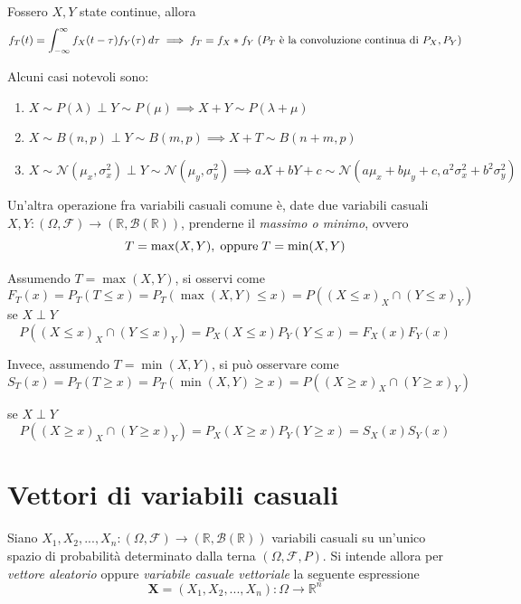 \documentclass{article}
\begin{document}
            Fossero $X, Y$ state continue, allora
            \[
                f_{T}(t) = \int_{-\infty}^{\infty} f_{X}(t - \tau)f_{Y}(\tau) \: d\tau \implies f_{T} = f_{X} * f_{Y} \; (P_{T} \textnormal{ è la convoluzione continua di } P_{X}, P_{Y})
            \]

            Alcuni casi notevoli sono:
            \begin{enumerate}
                \item $X \sim P(\lambda) \perp Y \sim P(\mu) \implies X + Y \sim P(\lambda + \mu)$
                \item $X \sim B(n, p) \perp Y \sim B(m, p) \implies X + T \sim B(n + m, p)$
                \item $X \sim \mathcal{N}(\mu_{x}, \sigma_{x}^{2}) \perp Y \sim \mathcal{N}(\mu_{y}, \sigma_{y}^{2}) \implies aX + bY + c \sim \mathcal{N}(a\mu_{x} + b\mu_{y} + c, a^{2} \sigma_{x}^{2} + b^{2} \sigma_{y}^{2})$
            \end{enumerate}

            
            \vspace{10pt}
            Un'altra operazione fra variabili casuali comune è, date due variabili casuali $X, Y: (\Omega, \mathcal{F}) \rightarrow (\mathbb{R}, \mathcal{B}(\mathbb{R}))$, prenderne il \textit{massimo o minimo}, ovvero
            \[
                T = \max(X, Y), \; \textnormal{oppure} \; T = \min(X, Y)
            \]
            
            Assumendo $T = \max(X, Y)$, si osservi come
            \[
                F_{T}(x) = P_{T}(T \leq x) = P_{T}(\max(X, Y) \leq x) = P((X \leq x)_{X} \cap (Y \leq x)_{Y})
            \]
            se $X \perp Y$
            \[
                P((X \leq x)_{X} \cap (Y \leq x)_{Y}) = P_{X}(X \leq x)P_{Y}(Y \leq x) = F_{X}(x)F_{Y}(x)
            \]

            Invece, assumendo $T = \min(X, Y)$, si può osservare come
            \[
                S_{T}(x) = P_{T}(T \geq x) = P_{T}(\min(X, Y) \geq x) = P((X \geq x)_{X} \cap (Y \geq x)_{Y})
            \]

            se $X \perp Y$
            \[
                P((X \geq x)_{X} \cap (Y \geq x)_{Y}) = P_{X}(X \geq x) P_{Y}(Y \geq x) = S_{X}(x)S_{Y}(x)
            \]



    \newpage
    \section{Vettori di variabili casuali}
        Siano $X_{1}, X_{2}, ..., X_{n}: (\Omega, \mathcal{F}) \rightarrow (\mathbb{R}, \mathcal{B}(\mathbb{R}))$ variabili casuali su un'unico spazio di probabilità determinato dalla terna $(\Omega, \mathcal{F}, P)$.
        Si intende allora per \textit{vettore aleatorio} oppure \textit{variabile casuale vettoriale} la seguente espressione
        \[
            \mathbf{X} = (X_{1}, X_{2}, ..., X_{n}): \Omega \rightarrow \mathbb{R}^{n}
        \]
\end{document}
